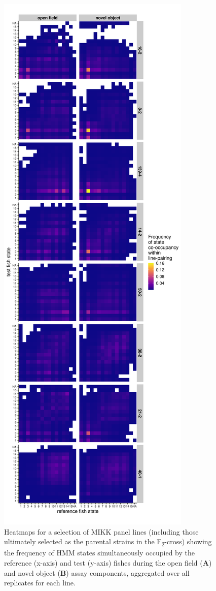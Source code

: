 \documentclass[
]{book}
\begin{document}
\begin{figure}
\includegraphics[width=1\linewidth]{figs/mikk_behaviour/0.08_15_cooc_heatmap} \caption{Heatmaps for a selection of MIKK panel lines (including those ultimately selected as the parental strains in the F\textsubscript{2}-cross) showing the frequency of HMM states simultaneously occupied by the reference (x-axis) and test (y-axis) fishes during the open field (\textbf{A}) and novel object (\textbf{B}) assay components, aggregated over all replicates for each line.}\label{fig:F0-sge-cooc-heat}
\end{figure}
\end{document}
